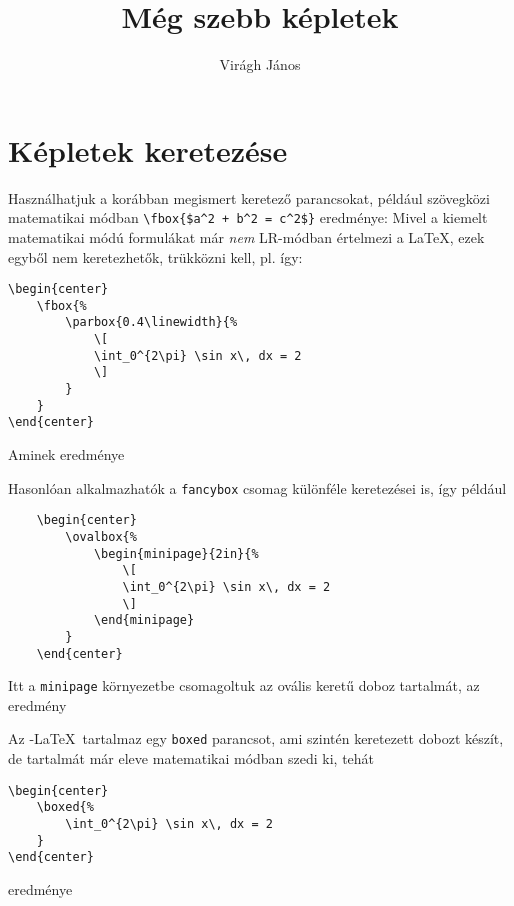 \documentclass{article}
\author{Virágh János}
\title{Még szebb képletek}
\begin{document}
\maketitle
\section{Képletek keretezése}
Használhatjuk a korábban megismert keretező parancsokat, például szövegközi matematikai módban 
\verb!\fbox{$a^2 + b^2 = c^2$}! eredménye: 
Mivel a kiemelt matematikai módú formulákat már \emph{nem} LR-módban értelmezi a \LaTeX, ezek egyből nem keretezhetők, trükközni kell, pl. így:
\begin{verbatim}
\begin{center}
	\fbox{%
		\parbox{0.4\linewidth}{%
			\[
			\int_0^{2\pi} \sin x\, dx = 2
			\]
		}
	}
\end{center}
\end{verbatim} \vspace*{-0.5em} Aminek eredménye 
\begin{center}
\end{center}
Hasonlóan alkalmazhatók a \texttt{fancybox} csomag különféle keretezései is, így
például 
\begin{verbatim}
	\begin{center}
		\ovalbox{%
			\begin{minipage}{2in}{%
				\[
				\int_0^{2\pi} \sin x\, dx = 2
				\]
			\end{minipage}
		}
	\end{center}
\end{verbatim} 
\vspace*{-0.5em} Itt a \texttt{minipage} környezetbe csomagoltuk az ovális keretű doboz tartalmát, az eredmény
	\begin{center}
	\ovalbox{%
		\begin{minipage}{2in}%
				\[
				\int_0^{2\pi} \sin x\, dx = 2
				\]
			\end{minipage}
		}
	
	\end{center}
	
Az \AmS-LaTeX\ tartalmaz egy \texttt{boxed} parancsot, ami szintén keretezett dobozt készít, de tartalmát már eleve matematikai módban szedi ki, tehát 
\begin{verbatim}
\begin{center}
	\boxed{%
		\int_0^{2\pi} \sin x\, dx = 2
	}	
\end{center}	
\end{verbatim}	
\vspace*{-0.5em}  eredménye 
\begin{center}
\end{center}
\end{document}
